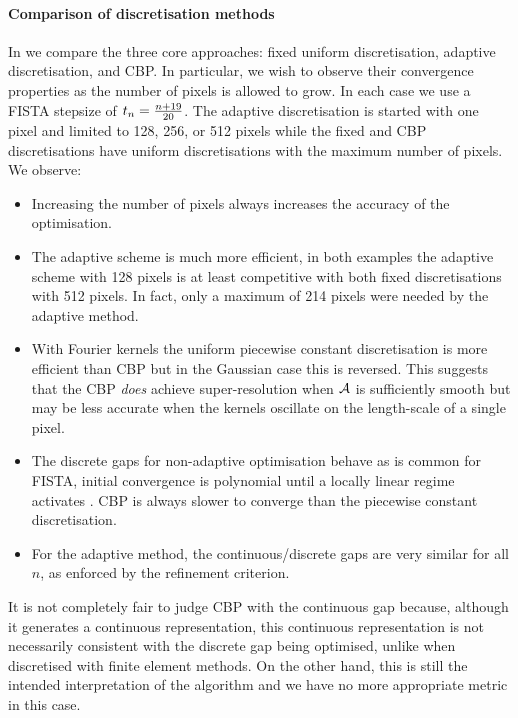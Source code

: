 \documentclass[10pt,a4paper,onecolumn]{article} \usepackage[latin1]{inputenc}
\numberwithin{equation}{section}
\newcommand*{\vart}[1]{%
	\IfEqCase{#1}{%
		{0}{s}%
		{1}{t}%
	}[t#1]%
}
\begin{document}
\paragraph{Comparison of discretisation methods}
In  we compare the three core approaches: fixed uniform
discretisation, adaptive discretisation, and CBP. In particular, we wish to observe their convergence properties as the number of pixels is allowed to grow. In each case we use a FISTA stepsize of $\vart1_n = \frac{n+19}{20}$. The adaptive discretisation is started with one pixel and limited to 128, 256, or 512 pixels while the fixed and CBP discretisations have uniform discretisations with the maximum number of pixels. We observe:
\begin{itemize}
	\item Increasing the number of pixels always increases the accuracy of the optimisation.
	\item The adaptive scheme is much more efficient, in both examples the adaptive scheme with 128 pixels is at least competitive with both fixed discretisations with 512 pixels. In fact, only a maximum of 214 pixels were needed by the adaptive method.
	\item With Fourier kernels the uniform piecewise constant discretisation is more efficient than CBP but in the Gaussian case this is reversed. This suggests that the CBP \emph{does} achieve super-resolution when $\mathcal{A}$ is sufficiently smooth but may be less accurate when the kernels oscillate on the length-scale of a single pixel.
	\item The discrete gaps for non-adaptive optimisation behave as is common for FISTA, initial convergence is polynomial until a locally linear regime activates \cite{Tao2016}. CBP is always slower to converge than the piecewise constant discretisation.
	\item For the adaptive method, the continuous/discrete gaps are very similar for all $n$, as enforced by the refinement criterion.
\end{itemize}
It is not completely fair to judge CBP with the continuous gap because, although it generates a continuous representation, this continuous representation is not necessarily consistent with the discrete gap being optimised, unlike when discretised with finite element methods. On the other hand, this is still the intended interpretation of the algorithm and we have no more appropriate metric in this case.
\end{document}
